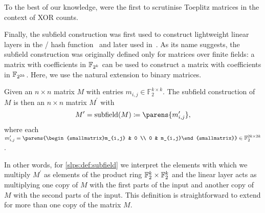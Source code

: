 To the best of our knowledge, \textcite{ToSC:SarSye16} were the first to scrutinise Toeplitz matrices in the context of XOR counts.

Finally, the subfield construction was first used to construct lightweight linear layers in the \whirlwind/ hash function~\cite[Section~2.2.2]{DCC:BNNRT10} and later used in~.
As its name suggests, the subfield construction was originally defined only for matrices over finite fields: a matrix with coefficients in $\mathbb{F}_{2^k}$ can be used to construct a matrix with coefficients in $\mathbb{F}_{2^{2k}}$.
Here, we use the natural extension to binary matrices.
\begin{definition}
    \label{slps:def:subfield}
    Given an $n \times n$ matrix $M$ with entries $m_{i,j} \in \mathbb{F}_2^{k \times k}$.
    The subfield construction of $M$ is then an $n \times n$ matrix $M^\prime$ with
    \begin{equation*}
        M^\prime = \subfield(M) \coloneqq \parens{m_{i,j}^\prime},
    \end{equation*}
    where each $m_{i,j}^\prime = \parens{\begin{smallmatrix}m_{i,j} & 0 \\ 0 & m_{i,j}\end{smallmatrix}} \in \mathbb{F}_2^{2k \times 2k}$.
\end{definition}
In other words, for \cref{slps:def:subfield} we interpret the elements with which we multiply $M^\prime$ as elements of the product ring $\mathbb{F}_2^k \times \mathbb{F}_2^k$ and the linear layer acts as multiplying one copy of $M$ with the first parts of the input and another copy of $M$ with the second parts of the input.
This definition is straightforward to extend for more than one copy of the matrix $M$.

